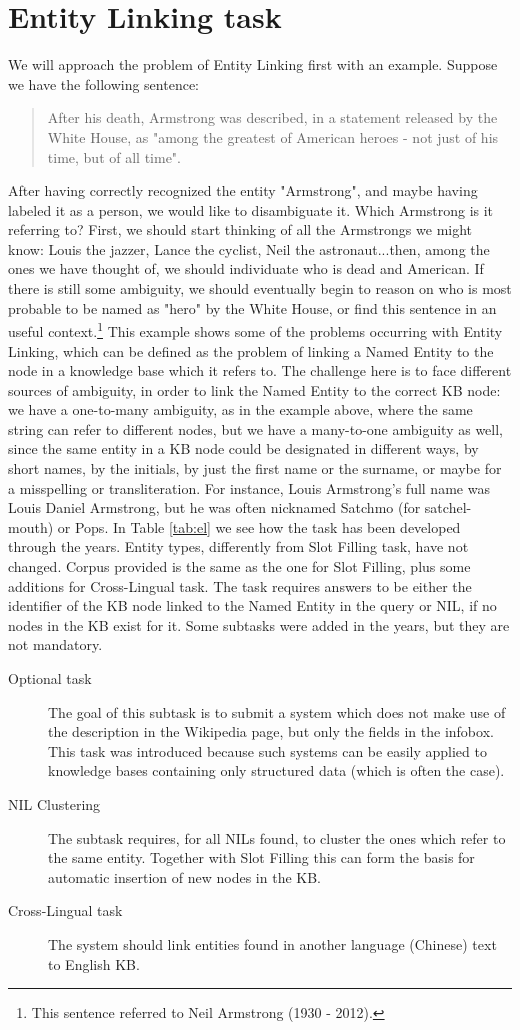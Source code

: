 \documentclass[a4paper,11pt]{report}
\begin{document}
\section{Entity Linking task}
We will approach the problem of Entity Linking first with an example.
Suppose we have the following sentence:
\begin{quote}
After his death, Armstrong was described, in a statement released by the White House, as "among the greatest of American heroes - not just of his time, but of all time".
\end{quote}
After having correctly recognized the entity "Armstrong", and maybe having labeled it as a person, we would like to disambiguate it. Which Armstrong is it referring to? First, we should start thinking of all the Armstrongs we might know: Louis the jazzer, Lance the cyclist, Neil the astronaut...then, among the ones we have thought of, we should individuate who is dead and American. If there is still some ambiguity, we should eventually begin to reason on who is most probable to be named as "hero" by the White House, or find this sentence in an useful context.\footnote{This sentence referred to Neil Armstrong (1930 - 2012).}
This example shows some of the problems occurring with Entity Linking, which can be defined as the problem of linking a Named Entity to the node in a knowledge base which it refers to. The challenge here is to face different sources of ambiguity, in order to link the Named Entity to the correct KB node: we have a one-to-many ambiguity, as in the example above, where the same string can refer to different nodes, but we have a many-to-one ambiguity as well, since the same entity in a KB node could be designated in different ways, by short names, by the initials, by just the first name or the surname, or maybe for a misspelling or transliteration. For instance, Louis Armstrong's full name was Louis Daniel Armstrong, but he was often nicknamed Satchmo (for satchel-mouth) or Pops.
In Table \ref{tab:el} we see how the task has been developed through the years. Entity types, differently from Slot Filling task, have not changed. Corpus provided is the same as the one for Slot Filling, plus some additions for Cross-Lingual task. The task requires answers to be either the identifier of the KB node linked to the Named Entity in the query or NIL, if no nodes in the KB exist for it.
Some subtasks were added in the years, but they are not mandatory.
\begin{description}
\item[Optional task] The goal of this subtask is to submit a system which does not make use of the description in the Wikipedia page, but only the fields in the infobox. This task was introduced because such systems can be easily applied to knowledge bases containing only structured data (which is often the case).
\item[NIL Clustering] The subtask requires, for all NILs found, to cluster the ones which refer to the same entity. Together with Slot Filling this can form the basis for automatic insertion of new nodes in the KB.
\item[Cross-Lingual task] The system should link entities found in another language (Chinese) text to English KB.
\end{description}
\end{document}
